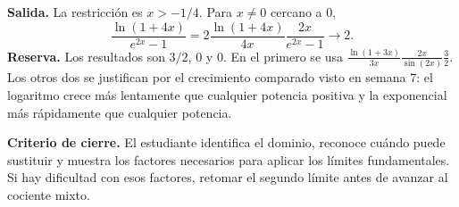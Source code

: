 \documentclass[10pt,a5paper]{article}
\begin{document}
\textbf{Salida.} La restricción es $x>-1/4$. Para $x\ne0$ cercano a $0$,
\[
 \frac{\ln(1+4x)}{e^{2x}-1}
 =2\frac{\ln(1+4x)}{4x}\frac{2x}{e^{2x}-1}
 \longrightarrow2.
\]
\textbf{Reserva.} Los resultados son $3/2$, $0$ y $0$. En el primero se usa
$\frac{\ln(1+3x)}{3x}\frac{2x}{\sin(2x)}\frac32$.
Los otros dos se justifican por el crecimiento comparado visto en semana 7: el logaritmo crece más lentamente que cualquier potencia positiva y la exponencial más rápidamente que cualquier potencia.

\textbf{Criterio de cierre.} El estudiante identifica el dominio, reconoce cuándo puede sustituir y muestra los factores necesarios para aplicar los límites fundamentales. Si hay dificultad con esos factores, retomar el segundo límite antes de avanzar al cociente mixto.
\fi
\end{document}
